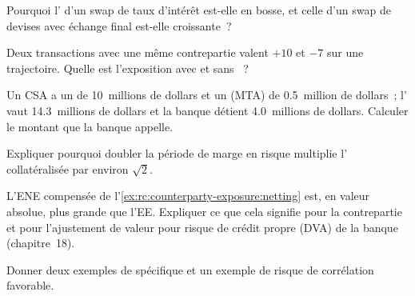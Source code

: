 \begin{exercise}[$\star$]\label{exo:rc:counterparty-exposure:1}
Pourquoi l' d'un swap de taux d'intérêt est-elle en bosse, et celle d'un swap de devises
avec échange final est-elle croissante~?
\end{exercise}

\begin{exercise}[$\star$]\label{exo:rc:counterparty-exposure:2}
Deux transactions avec une même contrepartie valent $+10$ et $-7$ sur une trajectoire. Quelle est l'exposition
avec et sans ~?
\end{exercise}

\begin{exercise}[$\star$]\label{exo:rc:counterparty-exposure:3}
Un CSA a un  de 10~millions de dollars et un  (MTA) de 0.5~million de dollars~; l'
vaut 14.3~millions de dollars et la banque détient 4.0~millions de dollars. Calculer le montant que la banque appelle.
\end{exercise}

\begin{exercise}[$\star\star$]\label{exo:rc:counterparty-exposure:4}
Expliquer pourquoi doubler la période de marge en risque multiplie l' collatéralisée par environ
$\sqrt2$.
\end{exercise}

\begin{exercise}[$\star\star$]\label{exo:rc:counterparty-exposure:5}
L'ENE compensée de l'\cref{ex:rc:counterparty-exposure:netting} est, en valeur absolue, plus grande que l'EE.
Expliquer ce que cela signifie pour la contrepartie et pour l'ajustement de valeur pour risque de crédit propre (DVA) de la banque (chapitre~18).
\end{exercise}

\begin{exercise}[$\star\star$]\label{exo:rc:counterparty-exposure:6}
Donner deux exemples de  spécifique et un exemple de risque de corrélation favorable.
\end{exercise}

